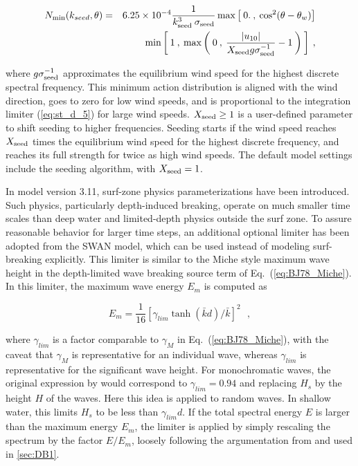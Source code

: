 
\begin{eqnarray}
N_{\min}(k_{seed},\theta) & = & 
        6.25 \times 10^{-4} \frac{1}{k_{\rm seed}^3 \: \sigma_{\rm seed}}
        \max \left [ \: 0. \: , \: \cos^2 ( \theta - \theta_w ) \right ]
                             \nonumber \\ & & \hspace{5mm}
        \min \left [ \: 1 \: , \: \max \left ( \: 0 \: , \: 
        \frac{|u_{10}|}{X_{\rm seed} g \sigma_{\rm seed}^{-1}}-1 
\: \right ) \: \right ] \: , \label{eq:seed} \end{eqnarray}

\noindent
where $g \sigma_{\rm seed}^{-1}$ approximates the equilibrium wind speed for
the highest discrete spectral frequency. This minimum action distribution is
aligned with the wind direction, goes to zero for low wind speeds, and is
proportional to the integration limiter (\ref{eq:st_d_5}) for large wind
speeds. $X_{\rm seed} \geq 1$ is a user-defined parameter to shift seeding to
higher frequencies. Seeding starts if the wind speed reaches $X_{\rm seed}$
times the equilibrium wind speed for the highest discrete frequency, and
reaches its full strength for twice as high wind speeds. The default model
settings include the seeding algorithm, with $X_{\rm seed} = 1$.

In model version 3.11, surf-zone physics parameterizations have been
introduced. Such physics, particularly depth-induced breaking, operate on much
smaller time scales than deep water and limited-depth physics outside the surf
zone. To assure reasonable behavior for larger time steps, an additional
optional limiter has been adopted from the SWAN model, which can be used instead of 
modeling surf-breaking explicitly.  This limiter is similar to the Miche
style maximum wave height in the depth-limited wave breaking source term of
Eq.~(\ref{eq:BJ78_Miche}). In this limiter, the maximum wave energy $E_m$ is
computed as


\begin{equation}
E_m = \frac{1}{16} [ \gamma_{lim}  \tanh ( \bar{k} d ) / \bar{k} ] ^2
\:\:\: , \label{eq:MLIM} 
\end{equation}

\noindent
where $\gamma_{lim}$ is a factor comparable to $\gamma_M$ in
Eq.~(\ref{eq:BJ78_Miche}), with the caveat that $\gamma_M$ is representative
for an individual wave, whereas $\gamma_{lim}$ is representative for the
significant wave height. For monochromatic waves, the original expression by
\cite{art:Miche44} would correspond to $\gamma_{lim} = 0.94$ and replacing
$H_s$ by the height $H$ of the waves. Here this idea is applied to random
waves.  In shallow water, this limits $H_s$ to be less than $\gamma_{lim} d$.
If the total spectral energy $E$ is larger than the maximum energy $E_m$, the
limiter is applied by simply rescaling the spectrum by the factor $E/E_m$,
loosely following the argumentation from \cite{art:EB96} and used
in \para\ref{sec:DB1}.  

